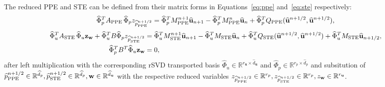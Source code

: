 The reduced PPE and STE can be defined from their matrix forms in Equations~\eqref{eq:ppe} and~\eqref{eq:ste} respectively:
\begin{align*}
  \widehat{\Phi}_{p}^T A_{\text{PPE}}\,\widehat{\Phi}_{p}z_{\widehat{p}^{n+1/2}_{\text{PPE}}} = \widehat{\Phi}_{p}^T M_{\text{PPE}}^{n+1}\widehat{\mathbf{u}}_{n+1} - \widehat{\Phi}_{p}^T M_{\text{PPE}}^{n}\widehat{\mathbf{u}}_{n} + \widehat{\Phi}_{p}^T Q_{\text{PPE}}(\widehat{\mathbf{u}}^{n+1/2}, \widehat{\mathbf{u}}^{n+1/2}),
\end{align*}
\begin{align*}
  \widehat{\Phi}_{u}^T A_{\text{STE}}\,\widehat{\Phi}_{u}\mathbf{z}_{\mathbf{w}} + \widehat{\Phi}_{u}^T B \widehat{\Phi}_{p}z_{\widehat{p}^{n+1/2}_{\text{STE}}} &= \widehat{\Phi}_{u}^T M_{\text{STE}}^{n+1}\widehat{\mathbf{u}}_{n+1} - \widehat{\Phi}_{u}^T M_{\text{STE}}\widehat{\mathbf{u}}_{n} + \widehat{\Phi}_{u}^T Q_{\text{STE}}(\widehat{\mathbf{u}}^{n+1/2}, \widehat{\mathbf{u}}^{n+1/2}) + \widehat{\Phi}_{u}^T M_{\text{STE}}\widehat{\mathbf{u}}_{n+1/2},\\
     \widehat{\Phi}_{p}^T B^T\widehat{\Phi}_{u}\mathbf{z}_{\mathbf{w}} &= 0,
\end{align*}
after left multiplication with the corresponding rSVD transported basis $\widehat{\Phi}_{u}\in\mathbb{R}^{r_{\mathbf u}\times \widehat{d}_{\mathbf u}}$ and $\widehat{\Phi}_{p}\in\mathbb{R}^{r_p\times \widehat{d}_p}$ and subsitution of $\widehat{p}^{n+1/2}_{\text{PPE}}\in\mathbb{R}^{\widehat{d}_p},\widehat{p}^{n+1/2}_{\text{STE}}\in\mathbb{R}^{\widehat{d}_p}, \mathbf{w}\in\mathbb{R}^{\widehat{d}_{\mathbf u}}$ with the respective reduced variables $z_{\widehat{p}^{n+1/2}_{\text{PPE}}}\in\mathbb{R}^{r_p},z_{\widehat{p}^{n+1/2}_{\text{STE}}}\in\mathbb{R}^{r_p}, z_{\mathbf{w}}\in\mathbb{R}^{r_{\mathbf u}}$.

